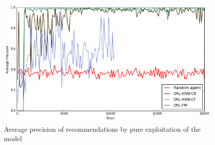 \begin{figure}[!t]
\centering
\includegraphics[scale=0.6]{images/eval_precision_test}
\caption{Average precision of recommendations by pure exploitation of the model}
\label{fig:precision_test}
\end{figure}
